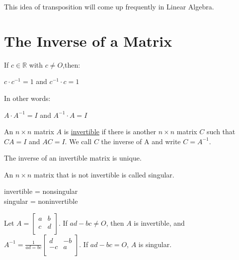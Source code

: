\documentclass{report}
\begin{document}
\begin{remark}
This idea of transposition will come up frequently in Linear Algebra.
\end{remark}

\section{The Inverse of a Matrix}
\begin{definition}
If $c \in \mathbb{R}$ with $c \neq O$,then:
\begin{center}
$c \cdot c^{-1} = 1$ and $c^{-1} \cdot c = 1$
\end{center}
In other words:
\begin{center}
	$A \cdot A^{-1} = I$ and $A^{-1} \cdot A = I$
\end{center}
\end{definition}

\begin{definition}
An $n\times n$ matrix $A$ is \underline{invertible} if there is another $n\times n$ matrix $C$ such that $CA=I$ and $AC=I$. We call $C$ the inverse of A and write $C=A^{-1}$.
\end{definition}

\begin{proposition}
The inverse of an invertible matrix is unique.
\end{proposition}

\begin{definition}
An $n\times n$ matrix that is not invertible is called singular.
\begin{center}
	invertible = nonsingular\\
	singular = noninvertible
\end{center}
\end{definition}

\begin{theorem}
Let $A = \begin{bmatrix}
a & b \\
c & d \\
\end{bmatrix}$.
If $ad-bc \neq O$, then $A$ is invertible, and $A^{-1} = \frac{1}{ad=bc}\begin{bmatrix}
	d & -b \\
	-c & a \\
\end{bmatrix}$. If $ad - bc = O$, $A$ is singular.
\end{theorem}
\end{document}
